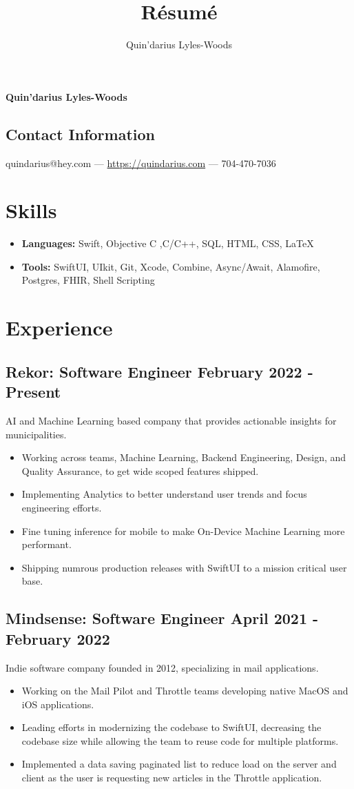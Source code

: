 \documentclass{article}
\makeatletter
\renewcommand{\maketitle}
{
\begin{center}
{\huge\bfseries
Quin'darius Lyles-Woods
}
\end{center}
\vspace{.25em}
\subsection{Contact Information}
quindarius@hey.com --- \url{https://quindarius.com} --- 704-470-7036
}
\makeatother
\begin{document}
\title{R\'esum\'e}
\author{Quin'darius Lyles-Woods}
\maketitle
\thispagestyle{empty}
\section{Skills}
\begin{itemize}
	\item \textbf{Languages: } Swift, Objective C ,C/C++, SQL, HTML, CSS, \LaTeX
	\item \textbf{Tools: } SwiftUI, UIkit, Git, Xcode, Combine, Async/Await, Alamofire, Postgres, FHIR, Shell Scripting
\end{itemize}
\section{Experience}
\subsection{\large{Rekor}: Software Engineer \hfill \small{February 2022 - Present}}
AI and Machine Learning based company that provides actionable insights for municipalities. 
\begin{itemize}
\setlength\itemsep{.1em}
	\item Working across teams, Machine Learning, Backend Engineering, Design, and Quality Assurance, to get wide scoped features shipped. 
	\item Implementing Analytics to better understand user trends and focus engineering efforts. 
	\item Fine tuning inference for mobile to make On-Device Machine Learning more performant. 
	\item Shipping numrous production releases with SwiftUI to a mission critical user base. 
\end{itemize}
\subsection{\large{Mindsense}: Software Engineer \hfill \small{April 2021 - February 2022}}
Indie software company founded in 2012, specializing in mail applications.
\begin{itemize}
\setlength\itemsep{.1em}
	\item Working on the Mail Pilot and Throttle teams developing native MacOS and iOS applications.
	\item Leading efforts in modernizing the codebase to SwiftUI, decreasing the codebase size while allowing the team to reuse code for multiple platforms. 
	\item Implemented a data saving paginated list to reduce load on the server and client as the user is requesting new articles in the Throttle application. 
\end{itemize}
\end{document}
